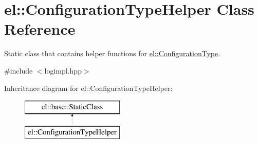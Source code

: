 \hypertarget{classel_1_1ConfigurationTypeHelper}{\section{el\-:\-:Configuration\-Type\-Helper Class Reference}
\label{classel_1_1ConfigurationTypeHelper}
}


Static class that contains helper functions for \hyperlink{namespaceel_a281f5db6d6163678bc68a8b23b59e124}{el\-::\-Configuration\-Type}.  




{\ttfamily \#include $<$logimpl.\-hpp$>$}

Inheritance diagram for el\-:\-:Configuration\-Type\-Helper\-:\begin{figure}[H]
\begin{center}
\leavevmode
\includegraphics[height=2.000000cm]{classel_1_1ConfigurationTypeHelper}
\end{center}
\end{figure}
